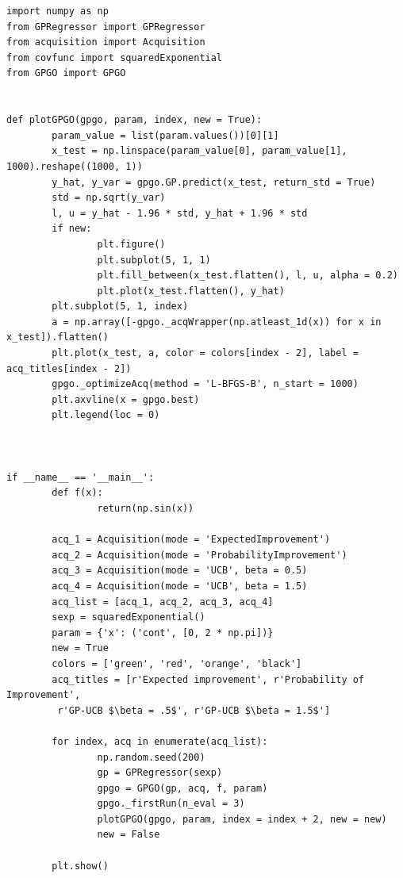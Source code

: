 \documentclass[10pt,a4paper,twoside]{book}
\begin{document}
\begin{verbatim}
import numpy as np
from GPRegressor import GPRegressor
from acquisition import Acquisition
from covfunc import squaredExponential
from GPGO import GPGO


def plotGPGO(gpgo, param, index, new = True):
        param_value = list(param.values())[0][1]
        x_test = np.linspace(param_value[0], param_value[1], 1000).reshape((1000, 1))
        y_hat, y_var = gpgo.GP.predict(x_test, return_std = True)
        std = np.sqrt(y_var)
        l, u = y_hat - 1.96 * std, y_hat + 1.96 * std
        if new:
                plt.figure()
                plt.subplot(5, 1, 1)
                plt.fill_between(x_test.flatten(), l, u, alpha = 0.2)
                plt.plot(x_test.flatten(), y_hat)
        plt.subplot(5, 1, index)
        a = np.array([-gpgo._acqWrapper(np.atleast_1d(x)) for x in x_test]).flatten()
        plt.plot(x_test, a, color = colors[index - 2], label = acq_titles[index - 2])
        gpgo._optimizeAcq(method = 'L-BFGS-B', n_start = 1000)
        plt.axvline(x = gpgo.best)
        plt.legend(loc = 0)
        


if __name__ == '__main__':
        def f(x):
                return(np.sin(x))

        acq_1 = Acquisition(mode = 'ExpectedImprovement')
        acq_2 = Acquisition(mode = 'ProbabilityImprovement')
        acq_3 = Acquisition(mode = 'UCB', beta = 0.5)
        acq_4 = Acquisition(mode = 'UCB', beta = 1.5)
        acq_list = [acq_1, acq_2, acq_3, acq_4]
        sexp = squaredExponential()
        param = {'x': ('cont', [0, 2 * np.pi])}
        new = True
        colors = ['green', 'red', 'orange', 'black']
        acq_titles = [r'Expected improvement', r'Probability of Improvement',
         r'GP-UCB $\beta = .5$', r'GP-UCB $\beta = 1.5$']

        for index, acq in enumerate(acq_list):
                np.random.seed(200)
                gp = GPRegressor(sexp)
                gpgo = GPGO(gp, acq, f, param)
                gpgo._firstRun(n_eval = 3)
                plotGPGO(gpgo, param, index = index + 2, new = new)
                new = False

        plt.show()                  
\end{verbatim}
\end{document}
